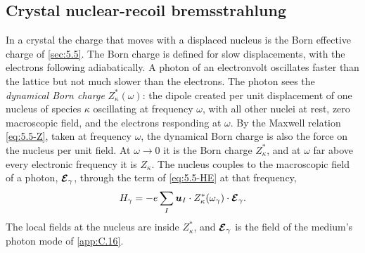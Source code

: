 \subsection{Crystal nuclear-recoil bremsstrahlung}\label{sec:12.6-brems}

In a crystal the charge that moves with a displaced nucleus is the Born effective charge of \cref{sec:5.5}. The Born charge is defined for slow displacements, with the electrons following adiabatically. A photon of an electronvolt oscillates faster than the lattice but not much slower than the electrons. The photon sees the \emph{dynamical Born charge} $Z^*_\kappa(\omega)$: the dipole created per unit displacement of one nucleus of species $\kappa$ oscillating at frequency $\omega$, with all other nuclei at rest, zero macroscopic field, and the electrons responding at $\omega$. By the Maxwell relation \cref{eq:5.5-Z}, taken at frequency $\omega$, the dynamical Born charge is also the force on the nucleus per unit field. At $\omega \to 0$ it is the Born charge $Z^*_\kappa$, and at $\omega$ far above every electronic frequency it is $Z_\kappa$. The nucleus couples to the macroscopic field of a photon, $\bm{\mathcal{E}}_\gamma$, through the term of \cref{eq:5.5-HE} at that frequency,
\begin{equation}
  H_\gamma = -e\sum_I\bm{u}_I\cdot Z^*_\kappa(\omega_\gamma)\cdot\bm{\mathcal{E}}_\gamma .
  \label{eq:12.6-Hgamma}
\end{equation}
The local fields at the nucleus are inside $Z^*_\kappa$, and $\bm{\mathcal{E}}_\gamma$ is the field of the medium's photon mode of \cref{app:C.16}.


